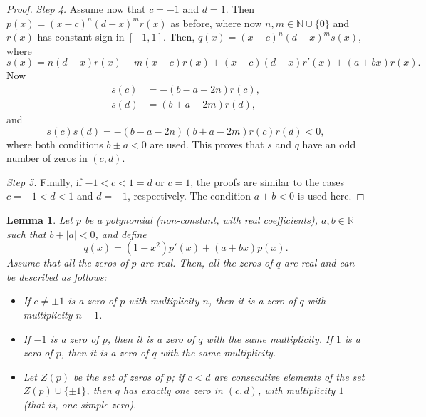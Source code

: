 \documentclass[10pt, a4paper, leqno]{amsart}
\numberwithin{equation}{section}
\theoremstyle{plain}
\newtheorem{Lem}[Theo]{Lemma}
\theoremstyle{remark}
\newcommand{\RR}{\mathbb{R}}
\newcommand{\NN}{\mathbb{N}}
\begin{document}
\begin{proof}
\medskip
\noindent
\textit{Step 4.} 
Assume now that $c = -1$ and $d = 1$. Then $p(x) = (x-c)^n (d-x)^m r(x)$ as before, where now $n, m \in \NN \cup \{ 0 \}$ and $r(x)$ has constant sign in $[-1,1]$. Then, $q(x) = (x-c)^n (d-x)^m s(x)$, where
\[
  s(x) = n(d-x) r(x) - m(x-c)r(x) + (x-c)(d-x) r'(x)
  + (a+bx) r(x).
\]
Now
\begin{align*}
  s(c) &= - (b-a-2n) r(c),
  \\
  s(d) &= (b + a - 2m) r(d),
\end{align*}
and
\[
  s(c) s(d) = - (b-a-2n) (b + a - 2m) r(c) r(d) < 0,
\]
where both conditions $b \pm a < 0$ are used. This proves that $s$ and $q$ have an odd number of zeros in $(c,d)$.

\medskip
\noindent
\textit{Step 5.} 
Finally, if $-1 < c < 1 = d$ or $c = 1$, the proofs are similar to the cases $c = -1 < d < 1$ and $d = -1$, respectively. The condition $a + b < 0$ is used here.
\qedhere
\end{proof}

\begin{Lem}
Let $p$ be a polynomial (non-constant, with real coefficients), $a, b \in \RR$ such that $b + |a| < 0$, and define
\[
  q(x) = (1-x^2) p'(x) + (a+bx) p(x).
\]
Assume that all the zeros of $p$ are real. Then, all the zeros of $q$ are real and can be described as follows:
\begin{itemize}
\item If $c \ne \pm 1$ is a zero of $p$ with multiplicity $n$, then it is a zero of $q$ with multiplicity $n-1$.

\item If $-1$ is a zero of $p$, then it is a zero of $q$ with the same multiplicity. If $1$ is a zero of $p$, then it is a zero of $q$ with the same multiplicity.

\item Let $Z(p)$ be the set of zeros of $p$; if $c < d$ are consecutive elements of the set $Z(p) \cup \{\pm 1\}$, then $q$ has exactly one zero in $(c,d)$, with multiplicity $1$ (that is, one simple zero).
\end{itemize}
\end{Lem}
\end{document}
